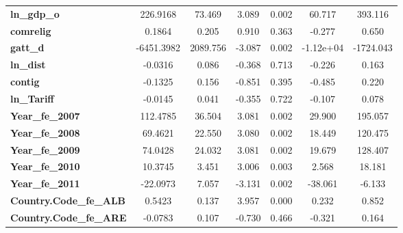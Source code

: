 \begin{center}
\begin{tabular}{lcccccc}
\textbf{ln\_gdp\_o}                                       &     226.9168  &       73.469     &     3.089  &         0.002        &       60.717    &      393.116     \\
\textbf{comrelig}                                         &       0.1864  &        0.205     &     0.910  &         0.363        &       -0.277    &        0.650     \\
\textbf{gatt\_d}                                          &   -6451.3982  &     2089.756     &    -3.087  &         0.002        &    -1.12e+04    &    -1724.043     \\
\textbf{ln\_dist}                                         &      -0.0316  &        0.086     &    -0.368  &         0.713        &       -0.226    &        0.163     \\
\textbf{contig}                                           &      -0.1325  &        0.156     &    -0.851  &         0.395        &       -0.485    &        0.220     \\
\textbf{ln\_Tariff}                                       &      -0.0145  &        0.041     &    -0.355  &         0.722        &       -0.107    &        0.078     \\
\textbf{Year\_fe\_2007}                                   &     112.4785  &       36.504     &     3.081  &         0.002        &       29.900    &      195.057     \\
\textbf{Year\_fe\_2008}                                   &      69.4621  &       22.550     &     3.080  &         0.002        &       18.449    &      120.475     \\
\textbf{Year\_fe\_2009}                                   &      74.0428  &       24.032     &     3.081  &         0.002        &       19.679    &      128.407     \\
\textbf{Year\_fe\_2010}                                   &      10.3745  &        3.451     &     3.006  &         0.003        &        2.568    &       18.181     \\
\textbf{Year\_fe\_2011}                                   &     -22.0973  &        7.057     &    -3.131  &         0.002        &      -38.061    &       -6.133     \\
\textbf{Country.Code\_fe\_ALB}                            &       0.5423  &        0.137     &     3.957  &         0.000        &        0.232    &        0.852     \\
\textbf{Country.Code\_fe\_ARE}                            &      -0.0783  &        0.107     &    -0.730  &         0.466        &       -0.321    &        0.164     \\

\end{tabular}
\end{center}
